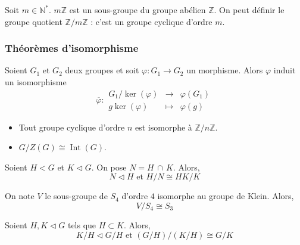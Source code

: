 	\begin{example}
		Soit $m \in \mathbb{N}^*$. $m \mathbb{Z}$ est un sous-groupe du groupe abélien $\mathbb{Z}$. On peut définir le groupe quotient $\mathbb{Z}/m\mathbb{Z}$ : c'est un groupe cyclique d'ordre $m$.
	\end{example}

	\subsubsection{Théorèmes d'isomorphisme}


	\begin{theorem}
		Soient $G_1$ et $G_2$ deux groupes et soit $\varphi : G_1 \rightarrow G_2$ un morphisme. Alors $\varphi$ induit un isomorphisme
		\[
			\overline{\varphi} :
			\begin{array}{ccc}
				G_1 / \ker(\varphi) &\rightarrow& \varphi(G_1) \\
				g\ker(\varphi) &\mapsto& \varphi(g)
			\end{array}
		\]
	\end{theorem}

	\begin{example}
		\begin{itemize}
			\item Tout groupe cyclique d'ordre $n$ est isomorphe à $\mathbb{Z}/n\mathbb{Z}$.
			\item $G/Z(G) \cong \operatorname{Int}(G)$.
		\end{itemize}
	\end{example}


	\begin{theorem}
		Soient $H < G$ et $K \lhd G$. On pose $N = H \, \cap \, K$. Alors,
		\[ N \lhd H \text{ et } H/N \cong HK/K \]
	\end{theorem}

	\begin{example}
		On note $V$ le sous-groupe de $S_4$ d'ordre $4$ isomorphe au groupe de Klein. Alors,
		\[ V/S_4 \cong S_3 \]
	\end{example}


	\begin{theorem}
		Soient $H, K \lhd G$ tels que $H \subset K$. Alors,
		\[ K/H \lhd G/H \text{ et } (G/H)/(K/H) \cong G/K \]
	\end{theorem}

